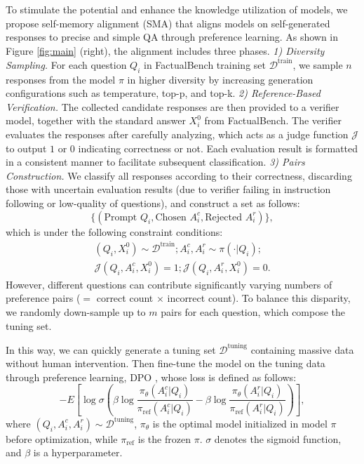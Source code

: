 To stimulate the potential and enhance the knowledge utilization of models, we propose self-memory alignment (SMA) that aligns models on self-generated responses to precise and simple QA through preference learning. As shown in Figure \ref{fig:main} (right), the alignment includes three phases. \textit{1) Diversity Sampling.} For each question $Q_i$ in FactualBench training set ${\mathcal{D}^{\text{train}}}$, we sample $n$ responses from the model $\pi$ in higher diversity by increasing generation configurations such as temperature, top-p, and top-k. \textit{2) Reference-Based Verification.} The collected candidate responses are then provided to a verifier model, together with the standard answer $X_i^0$ from FactualBench. The verifier evaluates the responses after carefully analyzing, which acts as a judge function $\mathcal{J}$ to output $1$ or $0$ indicating correctness or not. Each evaluation result is formatted in a consistent manner to facilitate subsequent classification. \textit{3) Pairs Construction.} We classify all responses according to their correctness, discarding those with uncertain evaluation results (due to verifier failing in instruction following or low-quality of questions), and construct a set as follows: 
\begin{equation}\textstyle
    \{(\text{Prompt } Q_i, \text{Chosen } A_i^c, \text{Rejected } A_i^r)\},
\end{equation}
which is under the following constraint conditions:
\begin{align}\textstyle
    (Q_i, X_i^0) \sim {\mathcal{D}^{\text{train}}}; A_i^c, A_i^r \sim \pi (\cdot | Q_i);\\
    \mathcal{J}(Q_i, A_i^c, X_i^0) = 1;  \mathcal{J}(Q_i, A_i^r, X_i^0) = 0.
\end{align}
However, different questions can contribute significantly varying numbers of preference pairs ($=$ correct count $\times$ incorrect count). To balance this disparity, we randomly down-sample up to $m$ pairs for each question, which compose the tuning set.

In this way, we can quickly generate a tuning set $\mathcal{D}^{\text{tuning}}$ containing massive data without human intervention. Then fine-tune the model on the tuning data through preference learning, DPO \citep{rafailov2023direct}, whose loss is defined as follows:
\begin{equation}\textstyle
    -E \left[ \log \sigma ( \beta \log \frac{\pi_{\theta} (A_i^c | Q_i)} {\pi_{\text{ref}} (A_i^c | Q_i)} - \beta \log \frac {\pi_{\theta} (A_i^r | Q_i)} {\pi_{\text{ref}} (A_i^r | Q_i)}) \right],
\end{equation}
where $(Q_i, A_i^c, A_i^r) \sim \mathcal{D}^{\text{tuning}}$, $\pi_{\theta}$ is the optimal model initialized in model $\pi$ before optimization, while $\pi_{\text{ref}}$ is the frozen $\pi$. $\sigma$ denotes the sigmoid function, and $\beta$ is a hyperparameter.
